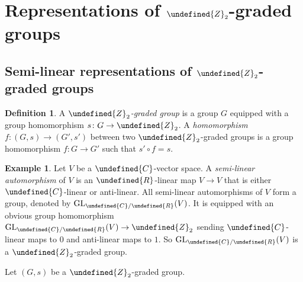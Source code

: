 \documentclass[10pt]{article}
\let\mathbb\undefined
\theoremstyle{definition}
\newtheorem{defn}[thm]{Definition}
\newtheorem{expl}[thm]{Example}
\numberwithin{equation}{section}
\numberwithin{thm}{section}
\newcommand{\Cb}{\mathbb{C}}
\newcommand{\Rb}{\mathbb{R}}
\newcommand{\Zb}{\mathbb{Z}}
\newcommand{\CC}{\EuScript{C}}
\begin{document}


\section{Representations of \texorpdfstring{$\Zb_2$}{Z2}-graded groups} \label{sec_semi-linear_rep}


\subsection{Semi-linear representations of \texorpdfstring{$\Zb_2$}{Z2}-graded groups}

\begin{defn}
A \emph{$\Zb_2$-graded group} is a group $G$ equipped with a group homomorphism $s \colon G \to \Zb_2$. A \emph{homomorphism} $f \colon (G,s) \to (G',s')$ between two $\Zb_2$-graded groups is a group homomorphism $f \colon G \to G'$ such that $s' \circ f = s$.
\end{defn}


\begin{expl}
Let $V$ be a $\Cb$-vector space. A \emph{semi-linear automorphism} of $V$ is an $\Rb$-linear map $V \to V$ that is either $\Cb$-linear or anti-linear. All semi-linear automorphisms of $V$ form a group, denoted by $\mathrm{GL}_{\Cb/\Rb}(V)$. It is equipped with an obvious group homomorphism $\mathrm{GL}_{\Cb/\Rb}(V) \to \Zb_2$ sending $\Cb$-linear maps to $0$ and anti-linear maps to $1$. So $\mathrm{GL}_{\Cb/\Rb}(V)$ is a $\Zb_2$-graded group.
\end{expl}

Let $(G,s)$ be a $\Zb_2$-graded group.
\end{document}
